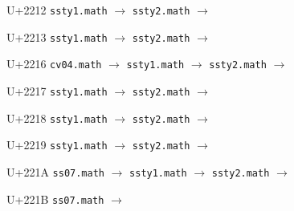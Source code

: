\documentclass{article}
\begin{document}
\begin{substitutions}
\goodbreak

U+2212  \linebreak
    \texttt{ssty1.math} $\to$  \linebreak
    \texttt{ssty2.math} $\to$  

\goodbreak

U+2213  \linebreak
    \texttt{ssty1.math} $\to$  \linebreak
    \texttt{ssty2.math} $\to$  

\goodbreak

U+2216  \linebreak
    \texttt{cv04.math} $\to$  \linebreak
    \texttt{ssty1.math} $\to$  \linebreak
    \texttt{ssty2.math} $\to$  

\goodbreak

U+2217  \linebreak
    \texttt{ssty1.math} $\to$  \linebreak
    \texttt{ssty2.math} $\to$  

\goodbreak

U+2218  \linebreak
    \texttt{ssty1.math} $\to$  \linebreak
    \texttt{ssty2.math} $\to$  

\goodbreak

U+2219  \linebreak
    \texttt{ssty1.math} $\to$  \linebreak
    \texttt{ssty2.math} $\to$  

\goodbreak

U+221A  \linebreak
    \texttt{ss07.math} $\to$  \linebreak
    \texttt{ssty1.math} $\to$  \linebreak
    \texttt{ssty2.math} $\to$  

\goodbreak

U+221B  \linebreak
    \texttt{ss07.math} $\to$  

\goodbreak


\end{substitutions}
\end{document}
